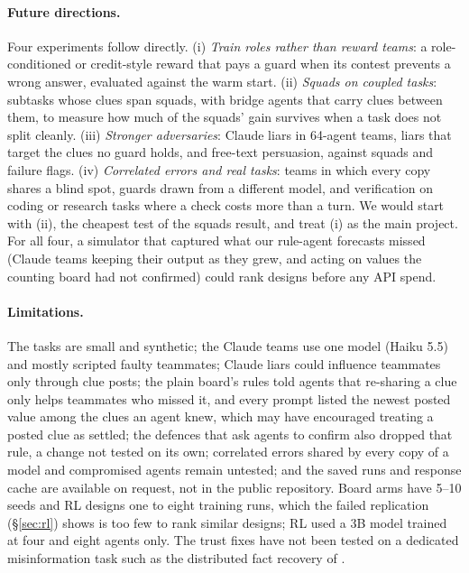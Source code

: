 \documentclass{article}
\begin{document}
\paragraph{Future directions.} Four experiments follow directly. (i) \emph{Train roles rather than reward teams}: a role-conditioned or credit-style reward that pays a guard when its contest prevents a wrong answer, evaluated against the warm start. (ii) \emph{Squads on coupled tasks}: subtasks whose clues span squads, with bridge agents that carry clues between them, to measure how much of the squads' gain survives when a task does not split cleanly. (iii) \emph{Stronger adversaries}: Claude liars in 64-agent teams, liars that target the clues no guard holds, and free-text persuasion, against squads and failure flags. (iv) \emph{Correlated errors and real tasks}: teams in which every copy shares a blind spot, guards drawn from a different model, and verification on coding or research tasks where a check costs more than a turn. We would start with (ii), the cheapest test of the squads result, and treat (i) as the main project. For all four, a simulator that captured what our rule-agent forecasts missed (Claude teams keeping their output as they grew, and acting on values the counting board had not confirmed) could rank designs before any API spend.

\paragraph{Limitations.} The tasks are small and synthetic; the Claude teams use one model (Haiku 5.5) and mostly scripted faulty teammates; Claude liars could influence teammates only through clue posts; the plain board's rules told agents that re-sharing a clue only helps teammates who missed it, and every prompt listed the newest posted value among the clues an agent knew, which may have encouraged treating a posted clue as settled; the defences that ask agents to confirm also dropped that rule, a change not tested on its own; correlated errors shared by every copy of a model and compromised agents remain untested; and the saved runs and response cache are available on request, not in the public repository. Board arms have 5--10 seeds and RL designs one to eight training runs, which the failed replication (\S\ref{sec:rl}) shows is too few to rank similar designs; RL used a 3B model trained at four and eight agents only. The trust fixes have not been tested on a dedicated misinformation task such as the distributed fact recovery of \citet{yan2026distributed}.
\end{document}
